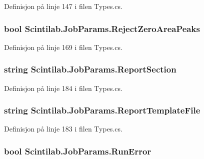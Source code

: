 Definisjon på linje 147 i filen Types.\+cs.

\hypertarget{class_scintilab_1_1_job_params_aa6cf431fa112d6414c1d8ec0128a1272}{
\subsubsection[{Reject\+Zero\+Area\+Peaks}]{\setlength{\rightskip}{0pt plus 5cm}bool Scintilab.\+Job\+Params.\+Reject\+Zero\+Area\+Peaks}}\label{class_scintilab_1_1_job_params_aa6cf431fa112d6414c1d8ec0128a1272}


Definisjon på linje 169 i filen Types.\+cs.

\hypertarget{class_scintilab_1_1_job_params_a9aa084b19e170f8f07640ac290cb75bc}{
\subsubsection[{Report\+Section}]{\setlength{\rightskip}{0pt plus 5cm}string Scintilab.\+Job\+Params.\+Report\+Section}}\label{class_scintilab_1_1_job_params_a9aa084b19e170f8f07640ac290cb75bc}


Definisjon på linje 184 i filen Types.\+cs.

\hypertarget{class_scintilab_1_1_job_params_a47c82919d1513d1bbef4387feaba1764}{
\subsubsection[{Report\+Template\+File}]{\setlength{\rightskip}{0pt plus 5cm}string Scintilab.\+Job\+Params.\+Report\+Template\+File}}\label{class_scintilab_1_1_job_params_a47c82919d1513d1bbef4387feaba1764}


Definisjon på linje 183 i filen Types.\+cs.

\hypertarget{class_scintilab_1_1_job_params_a6c08ea591430550f4ca4cc42ee2b7cca}{
\subsubsection[{Run\+Error}]{\setlength{\rightskip}{0pt plus 5cm}bool Scintilab.\+Job\+Params.\+Run\+Error}}\label{class_scintilab_1_1_job_params_a6c08ea591430550f4ca4cc42ee2b7cca}


